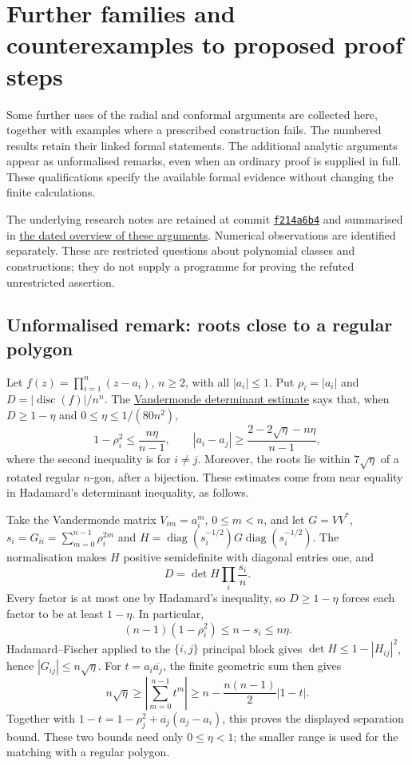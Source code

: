 \documentclass[11pt]{article}
\begin{document}
\section{Further families and counterexamples to proposed proof steps}
\label{sec:frontier}

Some further uses of the radial and conformal arguments are collected
here, together with examples where a prescribed construction fails.
The numbered results retain their linked formal statements. The
additional analytic arguments appear as unformalised remarks, even
when an ordinary proof is supplied in full. These qualifications specify the available formal evidence without
changing the finite calculations.

The underlying research notes are retained at commit
\href{https://github.com/wcook04/plectis-erdos/tree/f214a6b45528dc5eefe20ffadc35f2e981627d4c/research_corpus/Erdos1041}{\texttt{f214a6b4}}
and summarised in \href{https://github.com/wcook04/plectis-erdos/blob/f214a6b45528dc5eefe20ffadc35f2e981627d4c/research_corpus/Erdos1041/FRONTIER.md}{the dated overview of these arguments}.
Numerical observations are identified separately. These are restricted
questions about polynomial classes and constructions; they do not
supply a programme for proving the refuted unrestricted assertion.

\subsection*{Unformalised remark: roots close to a regular polygon}

Let $f(z)=\prod_{i=1}^n(z-a_i)$, $n\ge2$, with all $|a_i|\le1$.
Put $\rho_i=|a_i|$ and $D=|\operatorname{disc}(f)|/n^n$.  The
\href{https://github.com/wcook04/plectis-erdos/blob/f214a6b45528dc5eefe20ffadc35f2e981627d4c/research_corpus/Erdos1041/NearFeketeRadialAngularSplit.md}{Vandermonde determinant estimate}
says that, when $D\ge1-\eta$ and
$0\le\eta\le1/(80n^2)$,
\[
  1-\rho_i^2\le \frac{n\eta}{n-1},\qquad
  |a_i-a_j|\ge \frac{2-2\sqrt\eta-n\eta}{n-1},
\]
where the second inequality is for $i\ne j$. Moreover, the roots lie
within $7\sqrt\eta$ of a rotated regular $n$-gon, after a bijection.
These estimates come from near equality in Hadamard's determinant
inequality, as follows.

Take the Vandermonde matrix $V_{im}=a_i^m$, $0\le m<n$, and let
$G=VV^*$, $s_i=G_{ii}=\sum_{m=0}^{n-1}\rho_i^{2m}$ and
$H=\operatorname{diag}(s_i^{-1/2})G\operatorname{diag}(s_i^{-1/2})$.
The normalisation makes $H$ positive semidefinite with diagonal entries
one, and
\[
 D=\det H\prod_i\frac{s_i}{n}.
\]
Every factor is at most one by Hadamard's inequality, so $D\ge1-\eta$
forces each factor to be at least $1-\eta$. In particular,
\[
 (n-1)(1-\rho_i^2)\le n-s_i\le n\eta.
\]
Hadamard--Fischer applied to the $\{i,j\}$ principal block gives
$\det H\le1-|H_{ij}|^2$, hence $|G_{ij}|\le n\sqrt\eta$.
For $t=a_i\overline{a_j}$, the finite geometric sum then gives
\[
 n\sqrt\eta\ge\left|\sum_{m=0}^{n-1}t^m\right|
 \ge n-\frac{n(n-1)}2|1-t|.
\]
Together with
$1-t=1-\rho_j^2+\overline{a_j}(a_j-a_i)$, this proves the displayed
separation bound. These two bounds need only $0\le\eta<1$;
the smaller range is used for the matching with a regular polygon.
\end{document}
